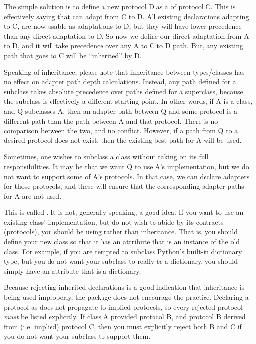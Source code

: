 \begin{verbatim%
}
\begin{verbatim%
}
\begin{verbatim%
}
\begin{verbatim%
}
\begin{verbatim%
}
\begin{verbatim%
}
The simple solution is to define a new protocol D as a  of
protocol C.  This is effectively saying that  can
adapt from C to D. All existing declarations adapting to C, are now usable as
adaptations to D, but they will have lower precedence than any direct
adaptation to D. So now we define our direct adaptation from A to D, and it
will take precedence over any A to C to D path. But, any existing path that
goes to C will be ``inherited'' by D.

Speaking of inheritance, please note that inheritance between types/classes has
no effect on adapter path depth calculations.  Instead, any path defined for a
subclass takes absolute precedence over paths defined for a superclass, because
the subclass is effectively a different starting point.  In other words, if A
is a class, and Q subclasses A, then an adapter path between Q and some
protocol is a different path than the path between A and that protocol.  There
is no comparison between the two, and no conflict.  However, if a path from Q
to a desired protocol does not exist, then the existing best path for A will be
used.

Sometimes, one wishes to subclass a class without taking on its full
responsibilities.  It may be that we want Q to use A's implementation, but we
do not want to support some of A's protocols. In that case, we can declare
 adapters for those protocols, and these will ensure
that the corresponding adapter paths for A are not used.





This is called .  It is not,
generally speaking, a good idea.  If you want to use an existing class'
implementation, but do not wish to abide by its contracts (protocols), you
should be using  rather than inheritance.  That is, you
should define your new class so that it has an attribute that is an instance of
the old class.  For example, if you are tempted to subclass Python's built-in
dictionary type, but you do not want your subclass to really \emph{be} a
dictionary, you should simply have an attribute that is a dictionary.

Because rejecting inherited declarations is a good indication that inheritance
is being used improperly, the  package does not encourage the
practice.  Declaring a protocol as  does not
propagate to implied protocols, so every rejected protocol \emph{must} be
listed explicitly.  If class A provided protocol B, and protocol B derived
from (i.e. implied) protocol C, then you must explicitly reject both B and C
if you do not want your subclass to support them.


\end{verbatim%
}
\end{verbatim%
}
\end{verbatim%
}
\end{verbatim%
}
\end{verbatim%
}
\end{verbatim%
}
